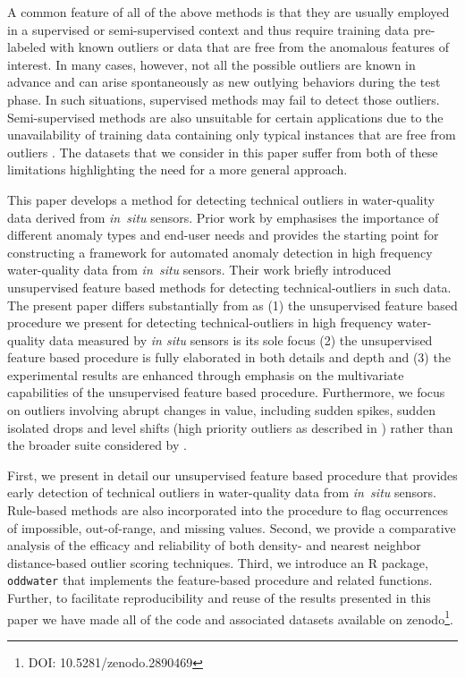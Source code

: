 \documentclass[draft]{agujournal2018} %
\begin{document}
A common feature of all of the above methods is that they are usually
employed in a supervised or semi-supervised context and thus require training data pre-labeled with known outliers  or data that are free from the anomalous features
of interest. In many cases, however, not all the possible outliers are
known in advance and can arise spontaneously as new outlying behaviors
during the test phase. In such situations, supervised methods may fail
to detect those outliers. Semi-supervised methods are also unsuitable
for certain applications due to the unavailability of training data
containing only typical instances that are free from outliers
\citep{goldstein2016comparative}. The datasets that we consider in
this paper suffer from both of these limitations highlighting
the need for a more general approach.

\color{black}

This paper develops a method for detecting technical outliers in water-quality data derived from  \emph{in~situ} sensors. Prior work by \citet{leigh2019framework} emphasises the importance of different anomaly types and end-user needs and provides the starting point for constructing a framework for automated anomaly detection in high frequency water-quality data from \emph{in~situ} sensors. Their work briefly introduced unsupervised feature based methods for detecting technical-outliers in such data. The present paper differs substantially from \citet{leigh2019framework} as (1) the unsupervised feature based procedure we present for detecting technical-outliers in high frequency water-quality data measured by \emph{in situ} sensors is its sole focus  (2) the unsupervised feature based procedure is fully elaborated in both details and depth and (3) the experimental results are enhanced through emphasis on the multivariate capabilities of the unsupervised feature based procedure. Furthermore, we focus on outliers involving abrupt changes in value, including sudden spikes, sudden isolated drops and level shifts (high priority outliers as described in \citet{leigh2019framework}) rather than the broader suite considered by \citet{leigh2019framework}.

First, we present in detail our unsupervised feature based procedure that provides early detection of technical outliers in water-quality data from \emph{in~situ} sensors. \color{black}  Rule-based methods are also incorporated into the procedure to flag occurrences of impossible, out-of-range, and missing values. Second, we provide a comparative analysis of the efficacy and reliability of both density- and nearest neighbor distance-based outlier scoring techniques. Third, we introduce an R \citep{Rsoftware} package, \texttt{oddwater} \citep{oddwater2018} that implements the  feature-based procedure and related functions. \color{black} Further, to facilitate reproducibility and reuse of the results presented in this paper we have  made all of the code and associated  datasets available on zenodo\footnote{DOI: 10.5281/zenodo.2890469}.
\end{document}
